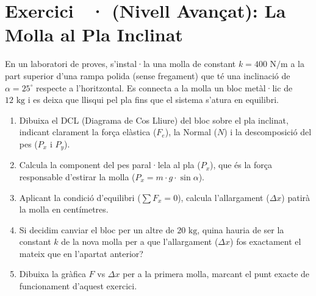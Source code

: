 \documentclass[12pt,a4paper,twoside]{article}
\newcounter{exercici}
\newcommand{\exercici}[1]{%
  \stepcounter{exercici}
  \section*{Exercici \theexercici\ \textnormal{· #1}}
  \vspace{-10pt}
}
\begin{document}
\clearpage
\exercici{(Nivell Avançat): La Molla al Pla Inclinat}
En un laboratori de proves, s'instal·la una molla de constant $k = 400\text{ N/m}$ a la part superior d'una rampa polida (sense fregament) que té una inclinació de $\alpha = 25^\circ$ respecte a l'horitzontal. Es connecta a la molla un bloc metàl·lic de $12\text{ kg}$ i es deixa que llisqui pel pla fins que el sistema s'atura en equilibri.
\begin{enumerate}[label=\textbf{\alph*)}]
  \item Dibuixa el DCL (Diagrama de Cos Lliure) del bloc sobre el pla inclinat, indicant clarament la força elàstica ($F_e$), la Normal ($N$) i la descomposició del pes ($P_x$ i $P_y$).
  \item Calcula la component del pes paral·lela al pla ($P_x$), que és la força responsable d'estirar la molla ($P_x = m \cdot g \cdot \sin \alpha$).
  \item Aplicant la condició d'equilibri ($\sum F_x = 0$), calcula l'allargament ($\Delta x$) patirà la molla en centímetres.
  \item Si decidim canviar el bloc per un altre de $20\text{ kg}$, quina hauria de ser la constant $k$ de la nova molla per a que l'allargament ($\Delta x$) fos exactament el mateix que en l'apartat anterior?
  \item Dibuixa la gràfica $F$ vs $\Delta x$ per a la primera molla, marcant el punt exacte de funcionament d'aquest exercici.
\end{enumerate}
\end{document}
